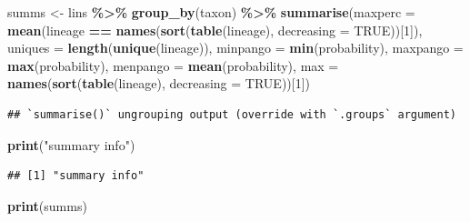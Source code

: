 \documentclass[
]{article}
\newenvironment{Shaded}{\begin{snugshade}}{\end{snugshade}}
\newcommand{\DataTypeTok}[1]{\textcolor[rgb]{0.13,0.29,0.53}{#1}}
\newcommand{\DecValTok}[1]{\textcolor[rgb]{0.00,0.00,0.81}{#1}}
\newcommand{\KeywordTok}[1]{\textcolor[rgb]{0.13,0.29,0.53}{\textbf{#1}}}
\newcommand{\NormalTok}[1]{#1}
\newcommand{\OperatorTok}[1]{\textcolor[rgb]{0.81,0.36,0.00}{\textbf{#1}}}
\newcommand{\OtherTok}[1]{\textcolor[rgb]{0.56,0.35,0.01}{#1}}
\newcommand{\StringTok}[1]{\textcolor[rgb]{0.31,0.60,0.02}{#1}}
\begin{document}
\begin{Shaded}
\begin{Highlighting}[]
\NormalTok{summs \textless{}{-}}\StringTok{ }\NormalTok{lins }\OperatorTok{\%\textgreater{}\%}\StringTok{ }
\StringTok{    }\KeywordTok{group\_by}\NormalTok{(taxon) }\OperatorTok{\%\textgreater{}\%}
\StringTok{    }\KeywordTok{summarise}\NormalTok{(}\DataTypeTok{maxperc =} \KeywordTok{mean}\NormalTok{(lineage }\OperatorTok{==}\StringTok{ }\KeywordTok{names}\NormalTok{(}\KeywordTok{sort}\NormalTok{(}\KeywordTok{table}\NormalTok{(lineage), }
        \DataTypeTok{decreasing =} \OtherTok{TRUE}\NormalTok{))[}\DecValTok{1}\NormalTok{]),}
        \DataTypeTok{uniques =} \KeywordTok{length}\NormalTok{(}\KeywordTok{unique}\NormalTok{(lineage)),}
        \DataTypeTok{minpango =} \KeywordTok{min}\NormalTok{(probability),}
        \DataTypeTok{maxpango =} \KeywordTok{max}\NormalTok{(probability),}
        \DataTypeTok{menpango =} \KeywordTok{mean}\NormalTok{(probability),}
        \DataTypeTok{max =} \KeywordTok{names}\NormalTok{(}\KeywordTok{sort}\NormalTok{(}\KeywordTok{table}\NormalTok{(lineage), }\DataTypeTok{decreasing =} \OtherTok{TRUE}\NormalTok{))[}\DecValTok{1}\NormalTok{])}
\end{Highlighting}
\end{Shaded}

\begin{verbatim}
## `summarise()` ungrouping output (override with `.groups` argument)
\end{verbatim}

\begin{Shaded}
\begin{Highlighting}[]
\KeywordTok{print}\NormalTok{(}\StringTok{"summary info"}\NormalTok{)}
\end{Highlighting}
\end{Shaded}

\begin{verbatim}
## [1] "summary info"
\end{verbatim}

\begin{Shaded}
\begin{Highlighting}[]
\KeywordTok{print}\NormalTok{(summs)}
\end{Highlighting}
\end{Shaded}
\end{document}
